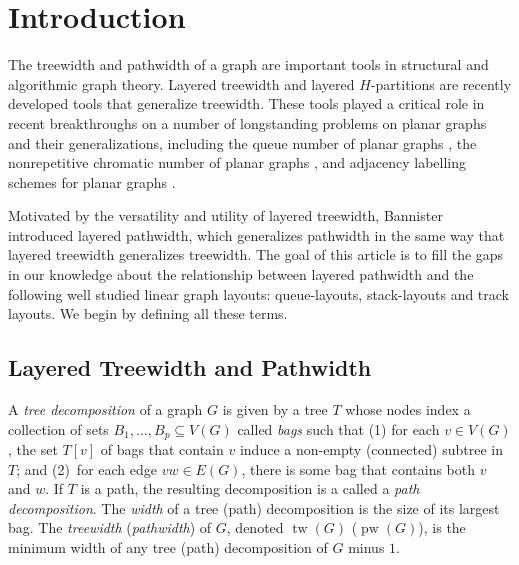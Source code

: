 \documentclass{patmorin}
\DeclareMathOperator{\pw}{pw}
\DeclareMathOperator{\tw}{tw}
\begin{document}

\section{Introduction}

The treewidth and pathwidth of a graph are important tools in
structural and algorithmic graph theory. Layered treewidth and layered
$H$-partitions are recently developed tools that generalize
treewidth. These tools played a critical role in recent breakthroughs on a
number of longstanding problems on planar graphs and their generalizations, including the queue number of planar graphs \cite{dujmovic.joret.ea:planar}, the nonrepetitive chromatic number of planar graphs \cite{dujmovic.esperet.ea:planar}, and adjacency labelling schemes for planar graphs \cite{dujmovic.esperet.ea:adjacency}.


 
Motivated
by the versatility and utility of layered treewidth, Bannister
\etal\ \cite{DBLP:conf/gd/BannisterDDEW16,bannister2018track}
introduced  layered pathwidth, which generalizes pathwidth in the same way
that layered treewidth generalizes treewidth.  The goal of this article is to fill the gaps in our knowledge about
the relationship between layered pathwidth and the following well studied
linear graph layouts: queue-layouts, stack-layouts and track
layouts.  We begin by defining all these terms.

\subsection{Layered Treewidth and Pathwidth}

A {\em tree decomposition} of a graph $G$ is given by a tree $T$ whose
nodes index a collection of sets $B_1,\ldots,B_p\subseteq V(G)$ called
\emph{bags} such that (1) for each $v\in V(G)$, the set $T[v]$ of bags that contain $v$ induce a
     non-empty (connected) subtree in $T$; and (2)~for each edge $vw\in E(G)$, there is some bag that contains both $v$ and $w$. If $T$ is a path, the resulting decomposition is a called a \emph{path decomposition}. The \emph{width} of a tree (path)
   decomposition is the size of its largest bag.  The \emph{treewidth}
   (\emph{pathwidth}) of $G$, denoted $\tw(G)$ ($\pw(G)$), is the minimum width of any tree (path) decomposition of $G$ minus $1$.
\end{document}
